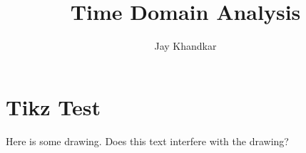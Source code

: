 \documentclass{article}
\title{Time Domain Analysis}
\author{Jay Khandkar}
\begin{document}
\maketitle
\newpage

\section{Tikz Test}

Here is some drawing. Does this text interfere with the drawing?\\
\begin{figure}[h!]
	\centering
\end{figure}
\end{document}
